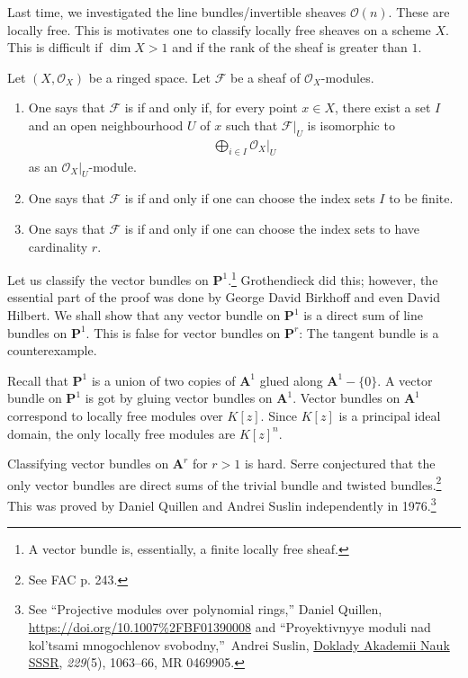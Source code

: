 \documentclass [11 pt, oneside] {article}
\begin{document}
Last time, we investigated the line bundles/invertible sheaves $\mathscr{O}(n)$. These are locally free. This is motivates one to classify locally free sheaves on a scheme $X$. This is difficult if $\dim X>1$ and if the rank of the sheaf is greater than $1$.

\begin{definition}\label{}\text{}
Let $(X,\mathscr{O}_X)$ be a ringed space. Let $\mathscr{F}$ be a sheaf of $\mathscr{O}_X$-modules.
\begin{enumerate}
	\item One says that $\mathscr{F}$ is  if and only if, for every point $x\in X$, there exist a set $I$ and an open neighbourhood $U$ of $x$ such that $\mathscr{F}\big|_U$ is isomorphic to 
		\begin{align*}
			\bigoplus_{i\in I}\mathscr{O}_X\big|_U 
		\end{align*}
		as an $\mathscr{O}_X\big|_U$-module.
	\item One says that $\mathscr{F}$ is  if and only if one can choose the index sets $I$ to be finite.
	\item One says that $\mathscr{F}$ is  if and only if one can choose the index sets to have cardinality $r$.
\end{enumerate}
\end{definition}

Let us classify the vector bundles on $\mathbf{P}^1$.\footnote{A vector bundle is, essentially, a finite locally free sheaf.}
Grothendieck did this; however, the essential part of the proof was done by George David Birkhoff and even David Hilbert.
We shall show that any vector bundle on $\mathbf{P}^1$ is a direct sum of line bundles on $\mathbf{P}^1$. This is false for vector bundles on $\mathbf{P}^r$: The tangent bundle is a counterexample.

Recall that $\mathbf{P}^1$ is a union of two copies of $\mathbf{A}^1$ glued along $\mathbf{A}^1-\{0\}$. A vector bundle on $\mathbf{P}^1$ is got by gluing vector bundles on $\mathbf{A}^1$. Vector bundles on $\mathbf{A}^1$ correspond to locally free modules over $K[z]$. Since $K[z]$ is a principal ideal domain, the only locally free modules are $K[z]^n$.
\begin{remark}
	Classifying vector bundles on $\mathbf{A}^r$ for $r>1$ is hard. Serre conjectured that the only vector bundles are direct sums of the trivial bundle and twisted bundles.\footnote{See FAC p. 243.} This was proved by Daniel Quillen and Andrei Suslin independently in 1976.\footnote{See ``Projective modules over polynomial rings,'' Daniel Quillen,\\ \url{https://doi.org/10.1007\%2FBF01390008} and ``Proyektivnyye moduli nad kol'tsami mnogochlenov svobodny,''\ Andrei Suslin, \underline{Doklady Akademii Nauk SSSR}, \textit{229}(5), 1063--66, MR 0469905.} 
\end{remark}
\end{document}
